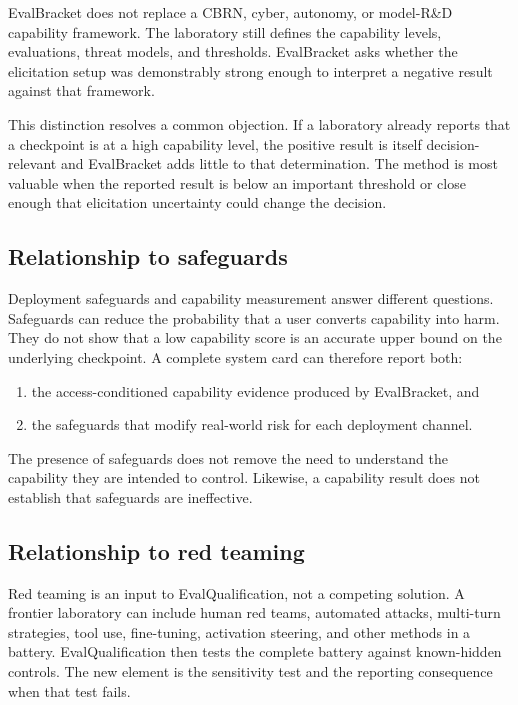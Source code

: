 \documentclass[11pt]{article}
\newcommand{\EB}{EvalBracket}
\newcommand{\EQual}{EvalQualification}
\begin{document}
\EB{} does not replace a CBRN, cyber, autonomy, or model-R\&D capability framework. The laboratory
still defines the capability levels, evaluations, threat models, and thresholds. \EB{} asks whether
the elicitation setup was demonstrably strong enough to interpret a negative result against that
framework.

This distinction resolves a common objection. If a laboratory already reports that a checkpoint is
at a high capability level, the positive result is itself decision-relevant and \EB{} adds little to
that determination. The method is most valuable when the reported result is below an important
threshold or close enough that elicitation uncertainty could change the decision.

\subsection{Relationship to safeguards}

Deployment safeguards and capability measurement answer different questions. Safeguards can reduce
the probability that a user converts capability into harm. They do not show that a low capability
score is an accurate upper bound on the underlying checkpoint. A complete system card can therefore
report both:

\begin{enumerate}[leftmargin=1.5em]
  \item the access-conditioned capability evidence produced by \EB, and
  \item the safeguards that modify real-world risk for each deployment channel.
\end{enumerate}

The presence of safeguards does not remove the need to understand the capability they are intended
to control. Likewise, a capability result does not establish that safeguards are ineffective.

\subsection{Relationship to red teaming}

Red teaming is an input to \EQual, not a competing solution. A frontier laboratory can include human
red teams, automated attacks, multi-turn strategies, tool use, fine-tuning, activation steering, and
other methods in a battery. \EQual{} then tests the complete battery against known-hidden controls.
The new element is the sensitivity test and the reporting consequence when that test fails.
\end{document}
